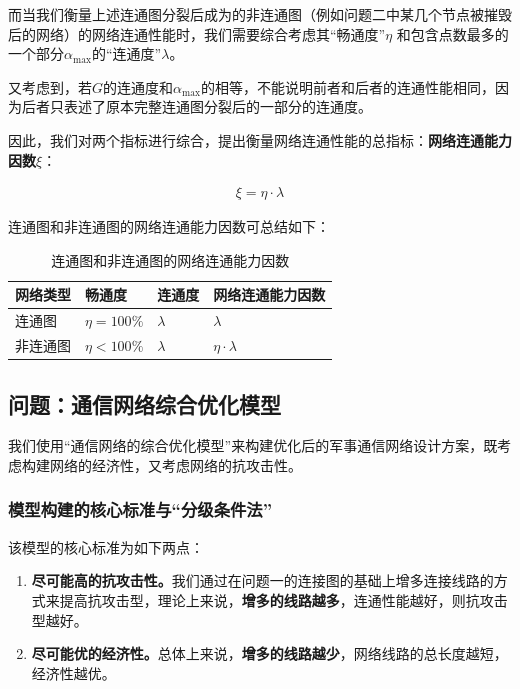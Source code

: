 \documentclass{article}
\begin{document}
而当我们衡量上述连通图分裂后成为的非连通图（例如问题二中某几个节点被摧毁后的网络）的网络连通性能时，我们需要综合考虑其“畅通度”$\eta$ 和包含点数最多的一个部分$\alpha_{\text{max}}$的“连通度”$\lambda$。

又考虑到，若$G$的连通度和$\alpha_{\text{max}}$的相等，不能说明前者和后者的连通性能相同，因为后者只表述了原本完整连通图分裂后的一部分的连通度。

因此，我们对两个指标进行综合，提出衡量网络连通性能的总指标：\textbf{网络连通能力因数}$\xi$：

\begin{align}
	\xi=\eta \cdot \lambda
\end{align}

连通图和非连通图的网络连通能力因数可总结如下：

\begin{table}[htpb]
	\centering
	\caption{连通图和非连通图的网络连通能力因数}
	\label{line}
	\begin{tabu}to.6
		\toprule
		网络类型 & 畅通度             & 连通度 &    网络连通能力因数          \\
		\midrule
		连通图    & $\eta=100\%$  &  $\lambda$  &  $\lambda$  \\
		非连通图  & $\eta<100\%$  & $\lambda$   &   $\eta \cdot \lambda$\\
		\bottomrule
	\end{tabu}
\end{table}

\subsection{问题：通信网络综合优化模型}
\label{ssub:问题\chinese{subsection}：通信网络综合优化模型}

我们使用“通信网络的综合优化模型”来构建优化后的军事通信网络设计方案，既考虑构建网络的经济性，又考虑网络的抗攻击性。

\subsubsection{模型构建的核心标准与“分级条件法”}
\label{模型构建的核心标准与“分级条件法”}

该模型的核心标准为如下两点：
\begin{enumerate}
	\item \textbf{尽可能高的抗攻击性。}我们通过在问题一的连接图的基础上增多连接线路的方式来提高抗攻击型，理论上来说，\textbf{增多的线路越多}，连通性能越好，则抗攻击型越好。
	\item \textbf{尽可能优的经济性。}总体上来说，\textbf{增多的线路越少}，网络线路的总长度越短，经济性越优。
\end{enumerate}
\end{document}
